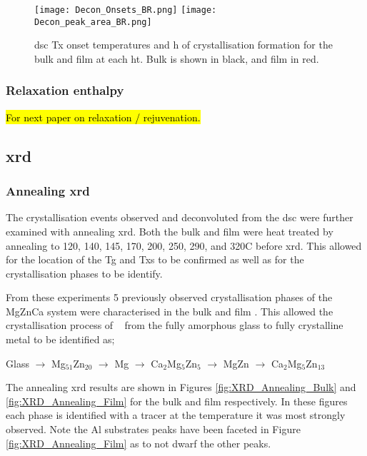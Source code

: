 \documentclass[a4paper,12pt,oneside]{article}%
\begin{document}
\begin{figure}[b]
	\centering
	\texttt{[image: Decon\_Onsets\_BR.png]}
	\medskip
	\texttt{[image: Decon\_peak\_area\_BR.png]}
	\caption{\acrshort{dsc} \gls{Tx} onset temperatures and \acrfull{h} of crystallisation formation for the bulk and film at each \acrfull{ht}. Bulk is shown in black, and film in red.}
	\label{fig:DSC_Decon}
\end{figure}

\subsubsection{Relaxation enthalpy}

\hl{For next paper on relaxation / rejuvenation.}

\subsection{\acrshort{xrd}}
\subsubsection{Annealing \acrshort{xrd}}

The crystallisation events observed and deconvoluted from the \acrshort{dsc} were further examined with annealing \acrshort{xrd}. Both the bulk and film were heat treated by annealing to 120, 140, 145, 170, 200, 250, 290, and 320\degree C before \acrshort{xrd}. This allowed for the location of the \gls{Tg} and \glspl{Tx} to be confirmed as well as for the crystallisation phases to be identify.

From these experiments 5 previously observed crystallisation phases of the MgZnCa system \cite{Zhang2013, Zhang2012, Zhang2011, Khan1989, Cao2016} were characterised in the bulk and film \MgZnCa. This allowed the crystallisation process of \MgZnCa~ from the fully amorphous glass to fully crystalline metal to be identified as;

\centerline{Glass $\rightarrow$ Mg$_{51}$Zn$_{20}$ $\rightarrow$ Mg $\rightarrow$ Ca$_{2}$Mg$_{5}$Zn$_{5}$ $\rightarrow$ MgZn $\rightarrow$ Ca$_{2}$Mg$_{5}$Zn$_{13}$}

The annealing \acrshort{xrd} results are shown in Figures \ref{fig:XRD_Annealing_Bulk} and \ref{fig:XRD_Annealing_Film} for the bulk and film respectively. In these figures each phase is identified with a tracer at the temperature it was most strongly observed. Note the Al substrates peaks have been faceted in Figure \ref{fig:XRD_Annealing_Film} as to not dwarf the other peaks. 
\end{document}

